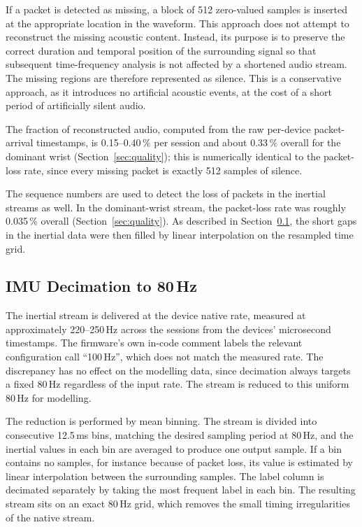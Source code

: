 If a packet is detected as missing, a block of 512 zero-valued samples is
inserted at the appropriate location in the waveform. This approach does not
attempt to reconstruct the missing acoustic content. Instead, its purpose is to
preserve the correct duration and temporal position of the surrounding signal
so that subsequent time-frequency analysis is not affected by a shortened audio
stream. The missing regions are therefore represented as silence. This is a
conservative approach, as it introduces no artificial acoustic events, at the
cost of a short period of artificially silent audio.

The fraction of reconstructed audio, computed from the raw per-device
packet-arrival timestamps, is 0.15--0.40\,\% per session and about 0.33\,\%
overall for the dominant wrist (Section~\ref{sec:quality}); this is numerically
identical to the packet-loss rate, since every missing packet is exactly 512
samples of silence.

The sequence numbers are used to detect the loss of packets in the inertial
streams as well. In the dominant-wrist stream, the packet-loss rate was roughly
0.035\,\% overall (Section~\ref{sec:quality}). As described in
Section~\ref{sec:decimation}, the short gaps in the inertial data were then
filled by linear interpolation on the resampled time grid.

\subsection{IMU Decimation to 80\,Hz}
\label{sec:decimation}

The inertial stream is delivered at the device native rate, measured at
approximately 220--250\,Hz across the sessions from the devices' microsecond
timestamps. The firmware's own in-code comment labels the relevant configuration
call ``100\,Hz'', which does not match the measured rate. The discrepancy has no
effect on the modelling data, since decimation always targets a fixed 80\,Hz
regardless of the input rate. The stream is reduced to this uniform 80\,Hz for
modelling.

The reduction is performed by mean binning. The stream is divided into
consecutive 12.5\,ms bins, matching the desired sampling period at 80\,Hz, and
the inertial values in each bin are averaged to produce one output sample. If a
bin contains no samples, for instance because of packet loss, its value is
estimated by linear interpolation between the surrounding samples. The label
column is decimated separately by taking the most frequent label in each bin.
The resulting stream sits on an exact 80\,Hz grid, which removes the small
timing irregularities of the native stream.

